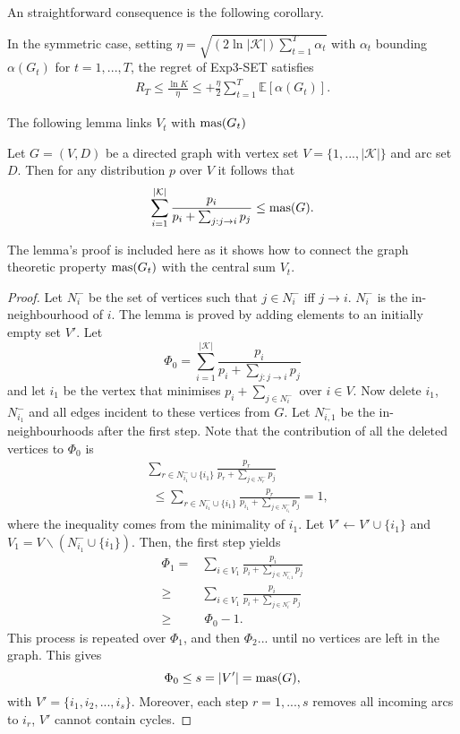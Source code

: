 An straightforward consequence is the following corollary.

\begin{corollary} \label{alon:corollary}
	In the symmetric case, setting $\eta=\sqrt{(2\ln |\mathcal{K}|)\sum_{t=1}^T\alpha_t}$ with $\alpha_t$ bounding $\alpha(G_t)$ for $t=1,...,T$, the regret of Exp3-SET satisfies 
	\begin{align}
		R_T\leq \frac{\ln K}{\eta} \leq +\frac{\eta}{2}\sum_{t=1}^T\mathbb{E}[\alpha(G_t)].
	\end{align}
\end{corollary}

The following lemma links $V_t$ with $\text{mas}(G_t)$

\begin{lemma}
	Let $G=(V,D)$ be a directed graph with vertex set $V=\{1,...,|\mathcal{K}|\}$ and arc set $D$. Then for any distribution $p$ over $V$ it follows that
	\begin{align}
		\sum_{i=1}^{|\mathcal{K}|}\frac{p_i}{p_i+\sum_{j:j\to i}p_j}\leq \text{mas}(G).
	\end{align}
\end{lemma}

The lemma's proof is included here as it shows how to connect the graph theoretic property $\text{mas}(G_t)$ with the central sum $V_t$. 
\begin{proof}
	Let $N_i^-$ be the set of vertices such that $j\in N_i^-$ iff $j\to i$. $N_i^-$ is the in-neighbourhood of $i$. The lemma is proved by adding elements to an initially empty set $V'$. Let 
	$$\Phi_0=\sum_{i=1}^{|\mathcal{K}|}\frac{p_i}{p_i+\sum_{j:j\to i}p_j}$$
	and let $i_1$ be the vertex that minimises $p_i+\sum_{j\in N_i^-}$ over $i\in V$. Now delete $i_1$, $N_{i_1}^-$ and all edges incident to these vertices from $G$. Let $N_{i,1}^-$ be the in-neighbourhoods after the first step. Note that the contribution of all the deleted vertices to $\Phi_0$ is 
	\begin{align*}
		&\sum_{r\in N_{i_1}^-\cup\{i_1\}}\frac{p_r}{p_r+\sum_{j\in N_r^-}p_j}\\
		&\:\:\leq \sum_{r\in N_{i_1}^-\cup\{i_1\}}\frac{p_r}{p_{i_1}+\sum_{j\in N_{i_1}^-}p_j}=1,
	\end{align*}
	where the inequality comes from the minimality of $i_1$. Let $V'\leftarrow V'\cup \{i_1\}$ and $V_1=V\backslash (N_{i_1}^-\cup\{i_1\})$. Then, the first step yields
	\begin{align*}
		\Phi_1=&\sum_{i\in V_1}\frac{p_i}{p_i+\sum_{j\in N_{i,1}^-}p_j}\\
		\geq & \sum_{i\in V_1}\frac{p_i}{p_i+\sum_{j\in N_i^-}p_j}\\
		\geq &\:\Phi_0-1.
	\end{align*}
	This process is repeated over $\Phi_1$, and then $\Phi_2$... until no vertices are left in the graph. This gives $$\Phi_0\leq s=|V'|=\text{mas}(G),$$ with $V'=\{i_1, i_2,...,i_s\}.$ Moreover, each step $r=1,...,s$ removes all incoming arcs to $i_r$, $V'$ cannot contain cycles. 
\end{proof}

